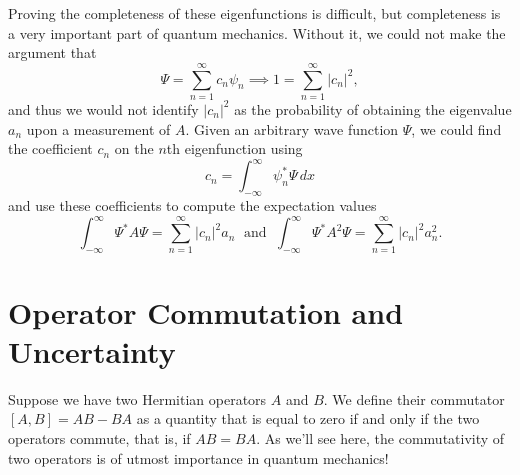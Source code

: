 \documentclass[../p052main.tex]{subfiles}
\begin{document}
Proving the completeness of these eigenfunctions is difficult, but completeness is a very important part of quantum mechanics.
Without it, we could not make the argument that
\[ \Psi = \sum_{n=1}^{\infty} c_n \psi_n \implies 1 = \sum_{n=1}^{\infty} |c_n|^2, \]
and thus we would not identify $|c_n|^2$ as the probability of obtaining the eigenvalue $a_n$ upon a measurement of $A$.
Given an arbitrary wave function $\Psi$, we could find the coefficient $c_n$ on the $n$th eigenfunction using
\[ c_n = \int_{-\infty}^{\infty} \psi_n^* \Psi \,dx \]
and use these coefficients to compute the expectation values
\[ \int_{-\infty}^{\infty} \Psi^* A \Psi = \sum_{n=1}^{\infty} |c_n|^2 a_n \;\text{ and }\; \int_{-\infty}^{\infty} \Psi^* A^2 \Psi = \sum_{n=1}^{\infty} |c_n|^2 a_n^2. \]



\section{Operator Commutation and Uncertainty}
Suppose we have two Hermitian operators $A$ and $B$.
We define their commutator $[A,B] = AB - BA$ as a quantity that is equal to zero if and only if the two operators commute, that is, if $AB = BA$.
As we'll see here, the commutativity of two operators is of utmost importance in quantum mechanics!
\end{document}
